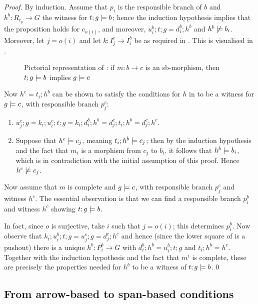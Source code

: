 \begin{proof}
By induction. Assume that $p_i$ is the responsible branch of $b$ and $h^b\colon R_{c_p}\to G$ the witness for $t;g\models b$; hence the induction hypothesis implies that the proposition holds for $c_{o(i)}$, and moreover, $u^b_i;t;g=d^b_i;h^b$ and $h^b\not\models b_i$. Moreover, let $j=o(i)$ and let $k\colon I^c_j\to I^b_i$ be as required in . This is visualised in .
%
\begin{figure}
  \centering
  
  \caption{Pictorial representation of : if $m:b\rightarrow c$ is an sb-morphism, then $t;g\models b$ implies $g\models c$}
\end{figure}

Now $h^c=t_i;h^b$ can be shown to satisfy the conditions for $h$ in  to be a witness for $g\models c$, with responsible branch $p^c_j$:
\begin{enumerate}
\item $u^c_j;g = k_i;u^c_i;t;g= k_i;d^b_i;h^b = d^c_j;t_i;h^b=d^c_j;h^c$.
\item Suppose that $h^c\models c_j$, meaning $t_i;h^b\models c_j$; then by the induction hypothesis and the fact that $m_i$ is a morphism from $c_j$ to $b_i$, it follows that $h^b\models b_i$, which is in contradiction with the initial assumption of this proof. Hence $h^c\not\models c_j$.
\end{enumerate}
%
Now assume that $m$ is complete and $g\models c$, with responsible branch $p^c_j$ and witness $h^c$. The essential observation is that we can find a responsible branch $p^b_i$ and witness $h^c$ showing $t;g\models b$.

In fact, since $o$ is surjective, take $i$ such that $j=o(i)$; this determines $p^b_i$. Now observe that $k_i;u^b_i;t;g=u^c_j;g=d^c_j;h^c$ and hence (since the lower square of  is a pushout) there is a unique $h^b:P^b_i\to G$ with $d^b_i;h^b=u^b_i;t;g$ and $t_i;h^b=h^c$. Together with the induction hypothesis and the fact that $m^i$ is complete, these are precisely the properties needed for $h^b$ to be a witness of $t;g\models b$.\qed
\end{proof}

\subsection{From arrow-based to span-based conditions}

